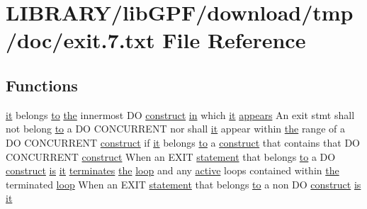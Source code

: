 \hypertarget{exit_87_8txt}{}\section{L\+I\+B\+R\+A\+R\+Y/lib\+G\+P\+F/download/tmp/doc/exit.7.txt File Reference}
\label{exit_87_8txt}
\subsection*{Functions}
\begin{DoxyCompactItemize}
\item 
\hyperlink{what__overview_81_8txt_a1468cf345691ca45f70578e0b7abd264}{it} belongs \hyperlink{M__stopwatch_83_8txt_a97209fd3e34ef701c0a9734280779cbb}{to} \hyperlink{M__stopwatch_83_8txt_a0f266597de2e57eb3aa964927bb30e14}{the} innermost DO \hyperlink{exit_87_8txt_aa7ebb4c04e8aa413d646a62e1f67fb5c}{construct} \hyperlink{M__journal_83_8txt_afce72651d1eed785a2132bee863b2f38}{in} which \hyperlink{what__overview_81_8txt_a1468cf345691ca45f70578e0b7abd264}{it} \hyperlink{exit_87_8txt_a66fa619682984d2d9673755b5015add3}{appears} An exit stmt shall not belong \hyperlink{M__stopwatch_83_8txt_a97209fd3e34ef701c0a9734280779cbb}{to} a DO C\+O\+N\+C\+U\+R\+R\+E\+NT nor shall \hyperlink{what__overview_81_8txt_a1468cf345691ca45f70578e0b7abd264}{it} appear within \hyperlink{M__stopwatch_83_8txt_a0f266597de2e57eb3aa964927bb30e14}{the} range of a DO C\+O\+N\+C\+U\+R\+R\+E\+NT \hyperlink{exit_87_8txt_aa7ebb4c04e8aa413d646a62e1f67fb5c}{construct} if \hyperlink{what__overview_81_8txt_a1468cf345691ca45f70578e0b7abd264}{it} belongs \hyperlink{M__stopwatch_83_8txt_a97209fd3e34ef701c0a9734280779cbb}{to} a \hyperlink{exit_87_8txt_aa7ebb4c04e8aa413d646a62e1f67fb5c}{construct} that contains that DO C\+O\+N\+C\+U\+R\+R\+E\+NT \hyperlink{exit_87_8txt_aa7ebb4c04e8aa413d646a62e1f67fb5c}{construct} When an E\+X\+IT \hyperlink{M__stopwatch_83_8txt_a43758526aa61bbaa49faf1e287658350}{statement} that belongs \hyperlink{M__stopwatch_83_8txt_a97209fd3e34ef701c0a9734280779cbb}{to} a DO \hyperlink{exit_87_8txt_aa7ebb4c04e8aa413d646a62e1f67fb5c}{construct} \hyperlink{intro__blas1_83_8txt_a42a91df93f840595de3019ceb5d1df23}{is} \hyperlink{what__overview_81_8txt_a1468cf345691ca45f70578e0b7abd264}{it} \hyperlink{do_87_8txt_aaa6a96bc95c5da31cfe2ec4f94db576c}{terminates} \hyperlink{M__stopwatch_83_8txt_a0f266597de2e57eb3aa964927bb30e14}{the} \hyperlink{continue_87_8txt_a5094e6a64d1227c84a0bf4db8f6c3788}{loop} and any \hyperlink{do_87_8txt_a3300b8e9ebbb88612226328b1b2fd93f}{active} loops contained within \hyperlink{M__stopwatch_83_8txt_a0f266597de2e57eb3aa964927bb30e14}{the} terminated \hyperlink{continue_87_8txt_a5094e6a64d1227c84a0bf4db8f6c3788}{loop} When an E\+X\+IT \hyperlink{M__stopwatch_83_8txt_a43758526aa61bbaa49faf1e287658350}{statement} that belongs \hyperlink{M__stopwatch_83_8txt_a97209fd3e34ef701c0a9734280779cbb}{to} a non DO \hyperlink{exit_87_8txt_aa7ebb4c04e8aa413d646a62e1f67fb5c}{construct} \hyperlink{intro__blas1_83_8txt_a42a91df93f840595de3019ceb5d1df23}{is} \hyperlink{what__overview_81_8txt_a1468cf345691ca45f70578e0b7abd264}{it} 
\end{DoxyCompactItemize}
